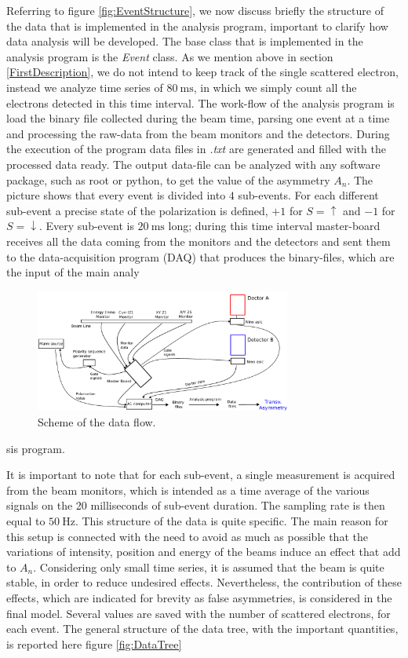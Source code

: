 Referring to figure \ref{fig:EventStructure}, we now discuss briefly the structure of the data that is implemented in the analysis program, important to clarify how data analysis will be developed.
The base class that is implemented in the analysis program is the \textit{Event} class. As we mention above in section \ref{FirstDescription}, we do not intend to keep track of the single scattered electron, instead we analyze time series of $\SI{80}{\milli \second}$, in which we simply count all the electrons detected in this time interval. The work-flow of the analysis program is load the binary file collected during the beam time, parsing  one event at a time and processing the raw-data from the beam monitors and the detectors. During the execution of the program data files in \textit{.txt} are generated and filled with the processed data ready. The output data-file can be analyzed with any software package, such as root or python, to get the value of the asymmetry $A_{n}$. 
The picture shows that every event is divided into $4$ sub-events. For each different sub-event a precise state of the polarization is defined, 
$+1$ for $S = \uparrow$ and $-1$ for $S = \downarrow$. Every sub-event is $\SI{20}{\milli \second}$ long; during this time interval master-board receives all the data coming from the monitors and the detectors and sent them to the data-acquisition program (DAQ) that produces the binary-files, which are the input of the main analy\begin{figure}[hbtp]

\centering
\includegraphics[width = 0.75\textwidth]{Analysis/Electronic_scheme.pdf}
\caption{Scheme of the data flow.}
\end{figure}
sis program.

 It is important to note that for each sub-event, a single measurement is acquired from the beam monitors, which is intended as a time average of the various signals on the 20 milliseconds of sub-event duration. The sampling rate is then equal to $\SI{50}{\hertz}$.
This structure of the data is quite specific. The main reason for this setup is connected with the need to avoid as much as possible that the variations of intensity, position and energy of the beams induce an effect that add to $A_{n}$. Considering only small time series, it is assumed that the beam is quite stable, in order to reduce undesired effects.
Nevertheless, the contribution of these effects, which are indicated for brevity as false asymmetries, is considered in the final model.
Several values are saved with the number of scattered electrons, for each event. The general structure of the data tree, with the important quantities, is reported here figure \ref{fig:DataTree}

